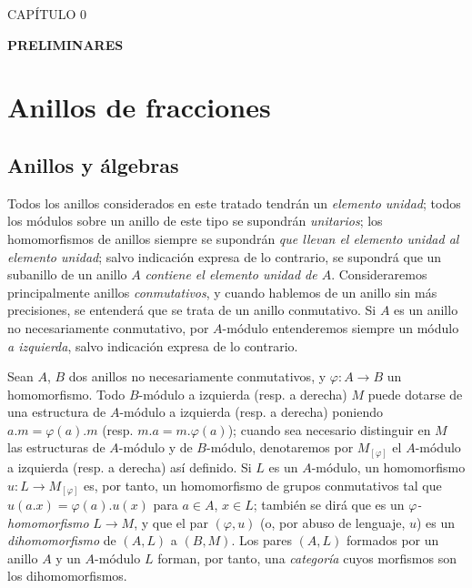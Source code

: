 \clearpage
{}
\begin{center}
{\large CAPÍTULO 0\par}
\vspace{1.5em}
{\Large\bfseries PRELIMINARES\par}
\end{center}

\section{Anillos de fracciones}
\label{section:0.1-fr}

\setcounter{subsection}{-1}
\subsection{Anillos y álgebras}
\label{subsection:0.1.0-fr}

\begin{env}[1.0.1]
\label{0.1.0.1-fr}
Todos los anillos considerados en este tratado tendrán un \emph{elemento unidad};
todos los módulos sobre un anillo de este tipo se supondrán \emph{unitarios}; los homomorfismos de anillos siempre se supondrán \emph{que llevan el elemento unidad al elemento unidad}; salvo indicación expresa de lo contrario, se supondrá que un subanillo de un anillo $A$ \emph{contiene el elemento unidad de $A$}.
Consideraremos principalmente anillos \emph{conmutativos}, y cuando hablemos de un anillo sin más precisiones, se entenderá que se trata de un anillo conmutativo.
Si $A$ es un anillo no necesariamente conmutativo, por $A$-módulo entenderemos siempre un módulo \emph{a izquierda}, salvo indicación expresa de lo contrario.
\end{env}

\begin{env}[1.0.2]
\label{0.1.0.2-fr}
Sean $A$, $B$ dos anillos no necesariamente conmutativos, y $\varphi:A\to B$ un homomorfismo.
Todo $B$-módulo a izquierda (resp. a derecha) $M$ puede dotarse de una estructura de $A$-módulo a izquierda (resp. a derecha) poniendo $a.m=\varphi(a).m$ (resp. $m.a=m.\varphi(a)$); cuando sea necesario distinguir en $M$ las estructuras de $A$-módulo y de $B$-módulo, denotaremos por $M_{[\varphi]}$ el $A$-módulo a izquierda (resp. a derecha) así definido.
Si $L$ es un $A$-módulo, un homomorfismo $u:L\to M_{[\varphi]}$ es, por tanto, un homomorfismo de grupos conmutativos tal que $u(a.x)=\varphi(a).u(x)$ para $a\in A$, $x\in L$; también se dirá que es un \emph{$\varphi$-homomorfismo} $L\to M$, y que el par $(\varphi,u)$ (o, por abuso de lenguaje, $u$) es un \emph{dihomomorfismo} de $(A,L)$ a $(B,M)$.
Los pares $(A,L)$ formados por un anillo $A$ y un $A$-módulo $L$ forman, por tanto, una \emph{categoría} cuyos morfismos son los dihomomorfismos.
\end{env}

